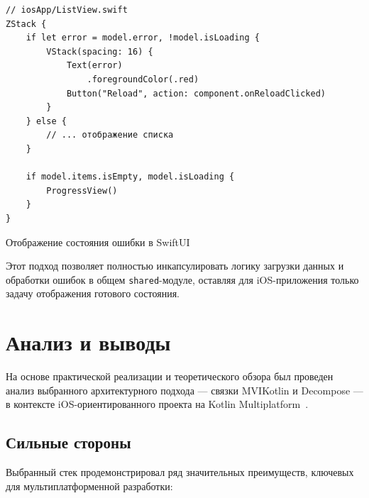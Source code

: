 \documentclass[14pt, russian]{scrartcl}
\begin{document}
\begin{listing}[H]
\begin{verbatim}
// iosApp/ListView.swift
ZStack {
    if let error = model.error, !model.isLoading {
        VStack(spacing: 16) {
            Text(error)
                .foregroundColor(.red)
            Button("Reload", action: component.onReloadClicked)
        }
    } else {
        // ... отображение списка
    }

    if model.items.isEmpty, model.isLoading {
        ProgressView()
    }
}
\end{verbatim}
\caption{Отображение состояния ошибки в SwiftUI}
\label{lst:swift_error_handling}
\end{listing}

Этот подход позволяет полностью инкапсулировать логику загрузки данных и обработки ошибок в общем \texttt{shared}-модуле, оставляя для iOS-приложения только задачу отображения готового состояния.

\section{Анализ и выводы}

На основе практической реализации и теоретического обзора был проведен анализ выбранного архитектурного подхода — связки MVIKotlin и Decompose — в контексте iOS-ориентированного проекта на Kotlin Multiplatform~\cite{mvikotlin-practice}.

\subsection{Сильные стороны}

Выбранный стек продемонстрировал ряд значительных преимуществ, ключевых для мультиплатформенной разработки:
\end{document}
